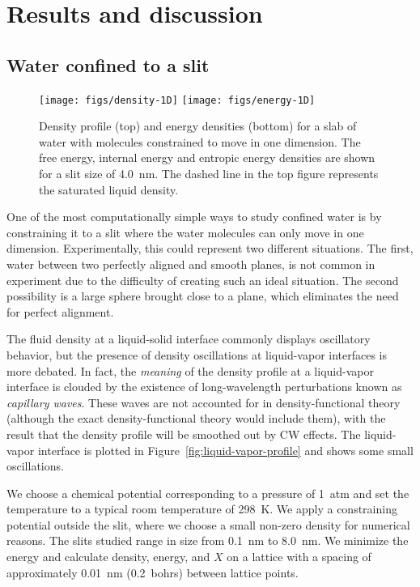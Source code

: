 \documentclass[letterpaper,twocolumn,amsmath,amssymb,prb]{revtex4-1}
\begin{document}
\section{Results and discussion}

\subsection{Water confined to a slit}

\begin{figure}
\begin{center}
\texttt{[image: figs/density-1D]}
\texttt{[image: figs/energy-1D]}
\end{center}
\caption{ Density profile (top) and 
energy densities (bottom) for a slab of water with molecules 
constrained to move in one dimension. The free energy, internal energy
and entropic energy densities are shown for a slit size of 4.0~nm. The dashed
line in the top figure represents the saturated liquid density.}
\label{fig:energy-1D}
\end{figure}

One of the most computationally simple ways to study confined water is by
constraining it to a slit where the water molecules can only move in one
dimension. Experimentally, this could represent two different situations.
The first, water between two perfectly aligned and smooth planes, is not common 
in experiment due to the difficulty of creating such an ideal situation. The
second
possibility is a large sphere brought close to a plane, which eliminates the 
need for perfect alignment.

The fluid density at a liquid-solid interface commonly displays
oscillatory behavior, but the presence of density oscillations at
liquid-vapor interfaces is more debated\cite{penfold2001structure}.
In fact, the \emph{meaning} of the density profile at a liquid-vapor
interface is clouded by the existence of long-wavelength perturbations
known as \emph{capillary waves}.  These waves are not accounted for in
density-functional theory (although the exact
density-functional theory would include them), with the result
that the density profile will be smoothed out by CW effects. The liquid-vapor
interface is plotted in Figure~\ref{fig:liquid-vapor-profile} and shows
some small oscillations.

We choose a chemical potential corresponding to a pressure of 1~atm and set the
temperature to a typical room temperature of 298~K. We apply 
a constraining potential outside the slit, where we choose a small non-zero
density for numerical reasons. The slits studied range in size from 0.1~nm to 
8.0~nm. We minimize the energy and calculate density, energy, and $X$ on a
lattice
with a spacing of approximately 0.01~nm (0.2~bohrs) between lattice points.
\end{document}
